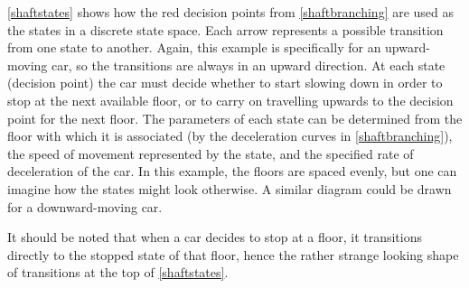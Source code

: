 \documentclass{UoYCSproject}
\begin{document}
\autoref{shaftstates} shows how the red decision points from \autoref{shaftbranching} are used as the states in a discrete state space.  Each arrow represents a possible transition from one state to another.  Again, this example is specifically for an upward-moving car, so the transitions are always in an upward direction.  At each state (decision point) the car must decide whether to start slowing down in order to stop at the next available floor, or to carry on travelling upwards to the decision point for the next floor.  The parameters of each state can be determined from the floor with which it is associated (by the deceleration curves in \autoref{shaftbranching}), the speed of movement represented by the state, and the specified rate of deceleration of the car.  In this example, the floors are spaced evenly, but one can imagine how the states might look otherwise.  A similar diagram could be drawn for a downward-moving car.

It should be noted that when a car decides to stop at a floor, it transitions directly to the stopped state of that floor, hence the rather strange looking shape of transitions at the top of \autoref{shaftstates}.
\end{document}
